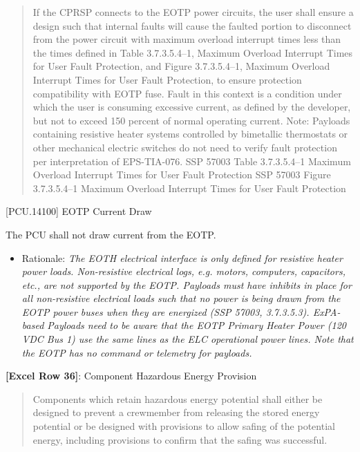 \begin{quote}
If the CPRSP connects to the EOTP power circuits, the user shall ensure a design such that internal faults will cause the faulted portion to disconnect from the power circuit with maximum overload interrupt times less than the times defined in Table 3.7.3.5.4--1, Maximum Overload Interrupt Times for User Fault Protection, and Figure 3.7.3.5.4--1, Maximum Overload Interrupt Times for User Fault Protection, to ensure protection compatibility with EOTP fuse. Fault in this context is a condition under which the user is consuming excessive current, as defined by the developer, but not to exceed 150 percent of normal operating current.
Note: Payloads containing resistive heater systems controlled by bimetallic thermostats or other mechanical electric switches do not need to verify fault protection per interpretation of EPS-TIA-076.
SSP 57003 Table 3.7.3.5.4--1 Maximum Overload Interrupt Times for User Fault Protection
SSP 57003 Figure 3.7.3.5.4--1 Maximum Overload Interrupt Times for User Fault Protection
\end{quote}

[PCU.14100] EOTP Current Draw

The PCU shall not draw current from the EOTP.

\begin{itemize}
\item{} Rationale: \emph{The EOTH electrical interface is only defined for resistive heater power loads. Non-resistive electrical logs, \emph{e.g.} motors, computers, capacitors, \emph{etc.}, are not supported by the EOTP. Payloads must have inhibits in place for all non-resistive electrical loads such that no power is being drawn from the EOTP power buses when they are energized (SSP 57003, 3.7.3.5.3). ExPA-based Payloads need to be aware that the EOTP Primary Heater Power (120 VDC Bus 1) use the same lines as the ELC operational power lines. Note that the EOTP has no command or telemetry for payloads.}

\end{itemize}

\textbf{[Excel Row 36]}: Component Hazardous Energy Provision

\begin{quote}
Components which retain hazardous energy potential shall either be designed to prevent a crewmember from releasing the stored energy potential or be designed with provisions to allow safing of the potential energy, including provisions to confirm that the safing was successful.
\end{quote}

